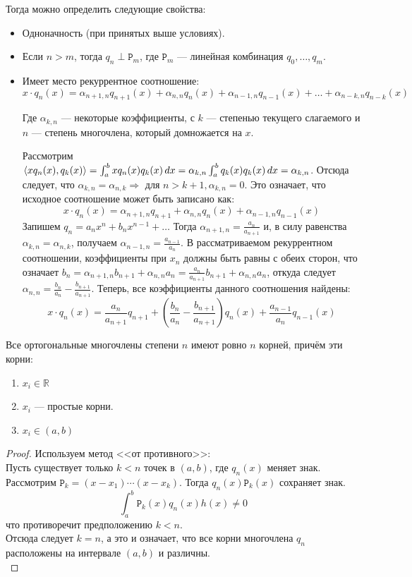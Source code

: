 \documentclass[12pt]{article}
\begin{document}
		Тогда можно определить следующие свойства:
		\begin{itemize}
			\item Одноначность (при принятых выше условиях).
			\item Если $n > m$, тогда $q_n \perp \mathtt{P}_m$, где $\mathtt{P}_m$ --- линейная комбинация $q_0, \dots , q_m$.
			\item Имеет место рекуррентное соотношение: \\
			$$ x \cdot q_n(x) = 
			\alpha_{n+1,n} q_{n+1}(x) + \alpha_{n,n} q_n(x) + \alpha_{n-1, n} q_{n-1} (x) + \ldots + \alpha_{n-k, n} q_{n-k} (x) $$
		
			Где $\alpha_{k, n}$ --- некоторые коэффициенты, с $k$ --- степенью текущего слагаемого и $n$ --- степень многочлена, который 
			домножается	на $x$.
		
			Рассмотрим $\left\langle x q_n(x), q_k(x) \right\rangle = \int_a^b x q_n(x) q_k(x) \,dx
				        = \alpha_{k,n} \int_a^b q_k(x) q_k(x) \,dx = \alpha_{k,n}$.
			Отсюда следует, что $\alpha_{k,n} = \alpha_{n,k} \Rightarrow$ для $n > k+1,\alpha_{k,n} = 0$. 
			Это означает, что исходное соотношение может быть записано как:
			$$ x \cdot q_n(x) = 
			\alpha_{n+1,n} q_{n+1} + \alpha_{n,n} q_n(x) + \alpha_{n-1, n} q_{n-1} (x)$$
			Запишем $q_n = a_n x^n + b_n x^{n-1} + \ldots$
			Тогда $\alpha_{n+1, n} = \frac{a_n}{a_{n+1}}$ и, в силу равенства $\alpha_{k,n} = \alpha_{n,k}$, получаем $\alpha_{n-1, n} 
			= \frac{a_{n-1}}{a_n}$. В рассматриваемом рекуррентном соотношении, коэффициенты при $x_n$ должны быть равны с обеих
			сторон, что означает $b_n = \alpha_{n+1, n} b_{n+1} + \alpha_{n,n} a_n = \frac{a_n}{a_{n+1}} b_{n+1} + \alpha_{n,n} a_n$, 
			откуда следует $\alpha_{n,n} = \frac{b_n}{a_n} - \frac{b_{n+1}}{a_{n+1}}$. Теперь, все коэффициенты данного соотношения
			найдены:
			$$ x \cdot q_n(x) = 
			\frac{a_n}{a_{n+1}} q_{n+1} + (\frac{b_n}{a_n} - \frac{b_{n+1}}{a_{n+1}}) q_n(x) + \frac{a_{n-1}}{a_n} q_{n-1} (x)$$
		\end{itemize}
	
		\begin{state}
			Все ортогональные многочлены степени $n$ имеют ровно $n$ корней, причём эти корни:
			\begin{enumerate}
				\item $x_i \in \mathbb{R}$
				\item $x_i$ --- простые корни.
				\item $x_i \in (a,b)$
			\end{enumerate}
			\begin{proof}
				Используем метод <<от противного>>: \\
				Пусть существует только $k < n$ точек в $(a,b)$, где $q_n(x)$ меняет знак. Рассмотрим 
				$\mathtt{P}_k = (x - x_1) \cdots (x - x_k)$. Тогда $q_n(x) \mathtt{P}_k(x)$ сохраняет знак. 
				$$ \int_a^b \mathtt{P}_k (x) q_n(x) h(x) \neq 0$$
				что противоречит предположению $k < n$. \\
				Отсюда следует $k = n$, а это и означает, что все корни многочлена $q_n$ расположены на интервале $(a,b)$ 
				и различны.\\
			\end{proof}
		\end{state}
\end{document}

